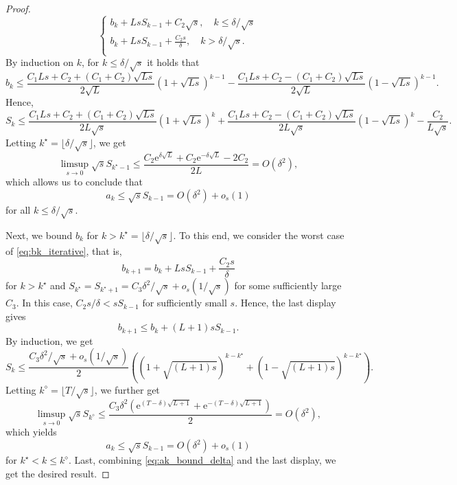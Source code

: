 \documentclass[twoside,11pt]{article}
\newcommand{\e}[1]{\mathrm{e}^{#1}}
\newcommand{\goto}{\rightarrow}
\begin{document}
\begin{proof}
\begin{equation}
\begin{cases}
b_k + LsS_{k-1} + C_2\sqrt{s}, \quad k \le \delta/\sqrt{s}\\
b_k + LsS_{k-1} + \frac{C_2s}{\delta}, \quad k > \delta/\sqrt{s}.\\
\end{cases}
\end{equation}
By induction on $k$, for $k \le \delta/\sqrt{s}$ it holds that
\[
b_k \le \frac{C_1Ls + C_2 + (C_1+C_2)\sqrt{Ls}}{2\sqrt{L}}(1 + \sqrt{Ls})^{k-1} - \frac{C_1Ls + C_2 - (C_1+C_2)\sqrt{Ls}}{2\sqrt{L}}(1 - \sqrt{Ls})^{k-1}.
\]
Hence,
\[
S_k \le \frac{C_1Ls + C_2 + (C_1+C_2)\sqrt{Ls}}{2L\sqrt{s}}(1 + \sqrt{Ls})^{k} + \frac{C_1Ls + C_2 - (C_1+C_2)\sqrt{Ls}}{2L\sqrt{s}}(1 - \sqrt{Ls})^k - \frac{C_2}{L\sqrt{s}}.
\]
Letting $k^\star = \lfloor \delta/\sqrt{s} \rfloor$, we get
\[
 \limsup_{s \goto 0} \sqrt{s}S_{k^\star-1} \le \frac{C_2\e{\delta\sqrt{L}} + C_2 \e{-\delta\sqrt{L}} - 2C_2}{2L} = O(\delta^2),
\]
which allows us to conclude that
\begin{equation}\label{eq:ak_bound_delta}
a_k \le \sqrt{s}S_{k-1} = O(\delta^2) + o_s(1)
\end{equation}
for all $k \le \delta/\sqrt{s}$.

Next, we bound $b_k$ for $k > k^\star = \lfloor \delta/\sqrt{s} \rfloor$. To this end, we consider the worst case of \eqref{eq:bk_iterative}, that is,
\[
b_{k+1} = b_k + LsS_{k-1} + \frac{C_2s}{\delta}
\]
for $k > k^\star$ and $S_{k^\star} = S_{k^\star+1} = C_3\delta^2/\sqrt{s} + o_s(1/\sqrt{s})$ for some sufficiently large $C_3$. In this case, $C_2s/\delta < sS_{k-1}$ for sufficiently small $s$. Hence, the last display gives
\[
b_{k+1} \le b_k + (L+1)sS_{k-1}.
\]
By induction, we get
\[
S_k \le \frac{C_3\delta^2/\sqrt{s} + o_s(1/\sqrt{s})}{2}\left( (1+\sqrt{(L+1)s})^{k-k^\star} +  (1-\sqrt{(L+1)s})^{k-k^\star} \right).
\]
Letting $k^\diamond = \lfloor T/\sqrt{s} \rfloor$, we further get
\[
\limsup_{s\goto 0} \sqrt{s}S_{k^\diamond} \le \frac{C_3\delta^2(\e{(T-\delta)\sqrt{L+1}} + \e{-(T-\delta)\sqrt{L+1}})}{2} = O(\delta^2),
\]
which yields
\begin{equation}\nonumber%
a_k \le \sqrt{s}S_{k-1} = O(\delta^2) + o_s(1)
\end{equation}
for $k^\star < k \le k^\diamond$. Last, combining \eqref{eq:ak_bound_delta} and the last display, we get the desired result.

\end{proof}
\end{document}
